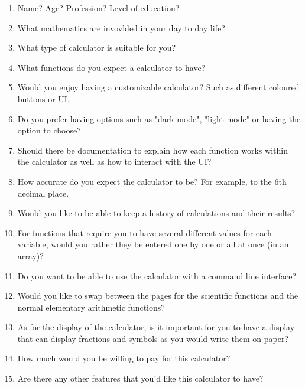 \documentclass[titlepage]{article}
\begin{document}
                \begin{enumerate}
                    \item Name? Age? Profession? Level of education?
                    \item What mathematics are invovlded in your day to day life?
                    \item What type of calculator is suitable for you?
                    \item What functions do you expect a calculator to have?
                    \item Would you enjoy having a customizable calculator? Such as different coloured buttons or UI.
                    \item Do you prefer having options such as "dark mode", "light mode" or having the option to choose?
                    \item Should there be documentation to explain how each function works within the calculator as well as how to interact with the UI?
                    \item How accurate do you expect the calculator to be? For example, to the 6th decimal place.
                    \item Would you like to be able to keep a history of calculations and their results?
                    \item For functions that require you to have several different values for each variable, would you rather they be entered one by one or all at once (in an array)?
                    \item Do you want to be able to use the calculator with a command line interface?
                    \item Would you like to swap between the pages for the scientific functions and the normal elementary arithmetic functions?
                    \item As for the display of the calculator, is it important for you to have a display that can display fractions and symbols as you would write them on paper?
                    \item How much would you be willing to pay for this calculator?
                    \item Are there any other features that you'd like this calculator to have?
                \end{enumerate}
        
\end{document}
